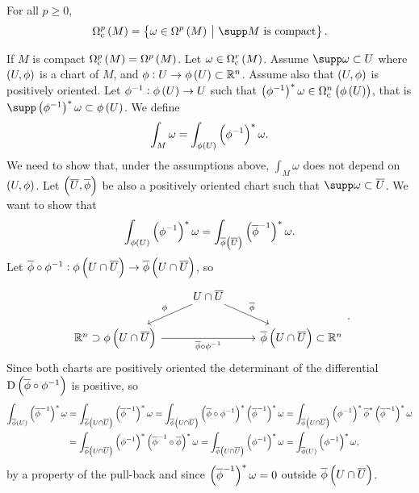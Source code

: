 
\begin{notation}
For all $ p \ge 0 $,
$$ \Omega_\c^p\br{M} = \cbr{\omega \in \Omega^p\br{M} \st \supp M \ \text{is compact}}. $$
\end{notation}

If $ M $ is compact $ \Omega_\c^p\br{M} = \Omega^p\br{M} $. Let $ \omega \in \Omega_\c^r\br{M} $. Assume $ \supp \omega \subset U $ where $ \br{U, \phi} $ is a chart of $ M $, and $ \phi : U \to \phi\br{U} \subset \RR^n $. Assume also that $ \br{U, \phi} $ is positively oriented. Let $ \phi^{-1} : \phi\br{U} \to U $ such that $ \br{\phi^{-1}}^*\omega \in \Omega_\c^n\br{\phi\br{U}} $, that is $ \supp \br{\phi^{-1}}^*\omega \subset \phi\br{U} $. We define
\begin{equation}
\label{eq:1}
\int_M \omega = \int_{\phi\br{U}} \br{\phi^{-1}}^*\omega.
\end{equation}
We need to show that, under the assumptions above, $ \int_M \omega $ does not depend on $ \br{U, \phi} $. Let $ \br{\overline{U}, \overline{\phi}} $ be also a positively oriented chart such that $ \supp \omega \subset \overline{U} $. We want to show that
$$ \int_{\phi\br{U}} \br{\phi^{-1}}^*\omega = \int_{\overline{\phi}\br{\overline{U}}} \br{\overline{\phi}^{-1}}^*\omega. $$
Let $ \overline{\phi} \circ \phi^{-1} : \phi\br{U \cap \overline{U}} \to \overline{\phi}\br{U \cap \overline{U}} $, so
$$
\begin{tikzcd}
& U \cap \overline{U} \arrow[swap]{dl}{\phi} \arrow{dr}{\overline{\phi}} & \\
\RR^n \supset \phi\br{U \cap \overline{U}} \arrow[swap]{rr}{\overline{\phi} \circ \phi^{-1}} & & \overline{\phi}\br{U \cap \overline{U}} \subset \RR^n
\end{tikzcd}.
$$
Since both charts are positively oriented the determinant of the differential $ \D\br{\overline{\phi} \circ \phi^{-1}} $ is positive, so
\begin{align*}
\int_{\overline{\phi}\br{U}} \br{\overline{\phi}^{-1}}^*\omega
& = \int_{\overline{\phi}\br{U \cap \overline{U}}} \br{\overline{\phi}^{-1}}^*\omega
= \int_{\overline{\phi}\br{U \cap \overline{U}}} \br{\overline{\phi} \circ \phi^{-1}}^*\br{\overline{\phi}^{-1}}^*\omega
= \int_{\overline{\phi}\br{U \cap \overline{U}}} \br{\phi^{-1}}^*\overline{\phi}^*\br{\overline{\phi}^{-1}}^*\omega \\
& = \int_{\overline{\phi}\br{U \cap \overline{U}}} \br{\phi^{-1}}^*\br{\overline{\phi}^{-1} \circ \overline{\phi}}^*\omega
= \int_{\overline{\phi}\br{U \cap \overline{U}}} \br{\phi^{-1}}^*\omega
= \int_{\overline{\phi}\br{U}} \br{\phi^{-1}}^*\omega,
\end{align*}
by a property of the pull-back and since $ \br{\overline{\phi}^{-1}}^*\omega = 0 $ outside $ \overline{\phi}\br{U \cap \overline{U}} $.

